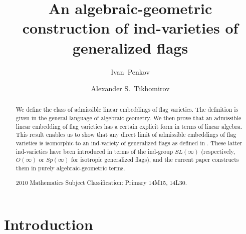 \documentclass[12pt]{amsart}
\theoremstyle{definition}
\begin{document}
\title{An algebraic-geometric construction of ind-varieties of
generalized flags}

\author[I.Penkov]{\;Ivan~Penkov}

\address{
Jacobs University Bremen \\
Campus Ring 1, 28759 
Bremen, Germany}

\author[Tikhomirov]{\;Alexander S.~Tikhomirov}


\address{
Faculty of Mathematics\\
National Research University
Higher School of Economics\\
6 Usacheva str.\\
119048 Moscow, Russia}









\thispagestyle{empty}

\begin{abstract}
We define the class of admissible linear embeddings of flag
varieties. The definition is given in the general language of
algebraic geometry. We then prove that an admissible linear
embedding of flag varieties has a certain explicit form in
terms of linear algebra. This result enables us to show that
any direct limit of admissible embeddings of flag varieties is
isomorphic to an ind-variety of generalized flags as defined in
\cite{DP}. These latter ind-varieties have been introduced in
terms of the ind-group $SL(\infty)$ (respectively, $O(\infty)$
or $Sp(\infty)$ for isotropic generalized flags), and the 
current paper constructs them in purely algebraic-geometric 
terms.





2010 Mathematics Subject Classification: Primary 14M15, 14L30. 




\end{abstract}

\maketitle





\section{Introduction}\label{sec1}
\label{Introduction}
\end{document}
